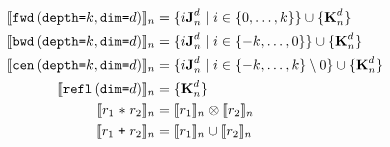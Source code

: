 \begin{align*}
%
%
\interp{\stenFwdS{k}{d}}_n & =
  \{i\singleEntry{d}{n} \mid i \in \{0, \ldots, k\} \} \cup \{ \zeroEntry{d}{n} \} \\
\interp{\stenBwdS{k}{d}}_n & =
  \{i\singleEntry{d}{n} \mid i \in \{-k, \ldots, 0\} \} \cup \{ \zeroEntry{d}{n} \} \\
\interp{\stenCenS{k}{d}}_n & =
  \{i\singleEntry{d}{n} \mid i \in \{-k, \ldots, k\} \setminus 0 \}
  \cup \{ \zeroEntry{d}{n} \} \\
\interp{\stenReflS{d}}_n & = \{ \zeroEntry{d}{n} \} \\
%
%
\interp{r_1 \; \texttt{$\ast$} \; r_2}_n &
= \interp{r_1}_n \otimes \interp{r_2}_n \\
%
%
\interp{r_1 \; \texttt{+} \; r_2}_n &
= \interp{r_1}_n \cup \interp{r_2}_n
\end{align*}
